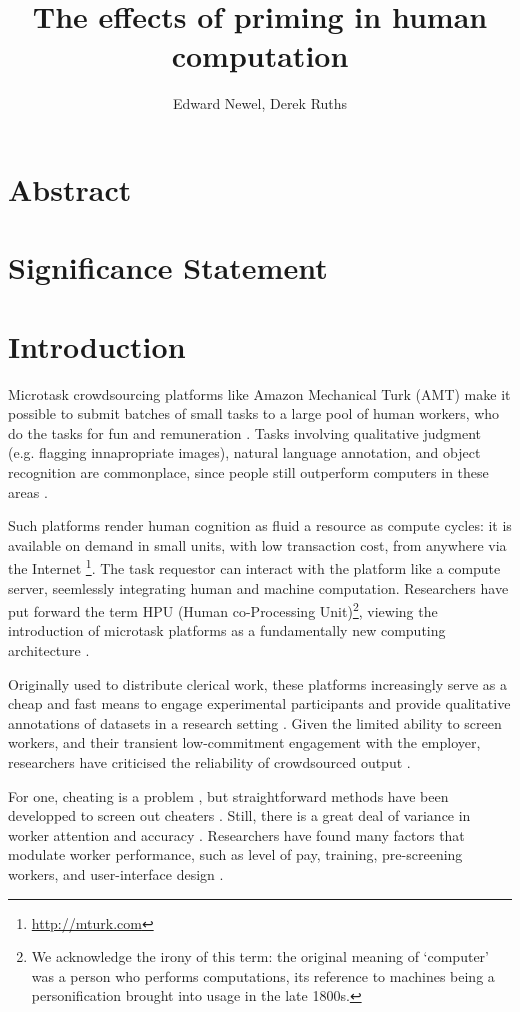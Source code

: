 \documentclass[a4paper]{report}
\title{The effects of priming in human computation}
\author{Edward Newel, Derek Ruths}
\begin{document}
\maketitle
\section*{Abstract}
\section*{Significance Statement}
\section*{Introduction}

Microtask crowdsourcing platforms like Amazon Mechanical Turk (AMT) make it 
possible to submit batches of small tasks to a large pool of human workers, 
who do the tasks for fun and remuneration \cite{kazai2013analysis}.  Tasks 
involving qualitative
judgment (e.g. flagging innapropriate images), natural language annotation,
and object recognition are commonplace, since people still outperform  
computers in these areas \cite{yuen2011survey}.

Such platforms render human cognition as fluid a resource as compute cycles: 
it is available on demand in small units, with low transaction cost, from 
anywhere via the Internet \footnote{\href{http://mturk.com}{http://mturk.com}}.
The task requestor can interact with the platform like a compute server, 
seemlessly 
integrating human and machine computation.  Researchers have put forward the 
term HPU (Human co-Processing Unit)\footnote{We acknowledge the irony of this 
term: the original meaning of `computer' was a person who performs 
computations, its reference to machines being a personification brought into 
usage in the late 1800s\cite{Dictionary:hl}.}, viewing the introduction of 
microtask platforms as a fundamentally new computing architecture
\cite{5543192}.  

Originally used to distribute clerical work, these platforms 
increasingly serve as a cheap and fast means to engage experimental 
participants and provide qualitative annotations of datasets in a research 
setting \cite{snow2008cheap}.  Given the limited ability to screen workers, and their transient 
low-commitment engagement with the employer, researchers have criticised the
reliability of crowdsourced output \cite{marsden2009crowdsourcing}.  

For one, cheating
is a problem \cite{lease2011quality}, but straightforward methods have been 
developped to screen out cheaters \cite{snow2008cheap, kazai2013analysis}.
Still, there is a great deal of variance in worker attention and 
accuracy \cite{kazai2013analysis}.  Researchers have found many factors that 
modulate worker performance, such as level of pay\cite{kazai2013analysis}, 
training\cite{le2010ensuring}, pre-screening 
workers\cite{paolacci2010running}, and user-interface design
\cite{Finnerty2013}.
\end{document}
